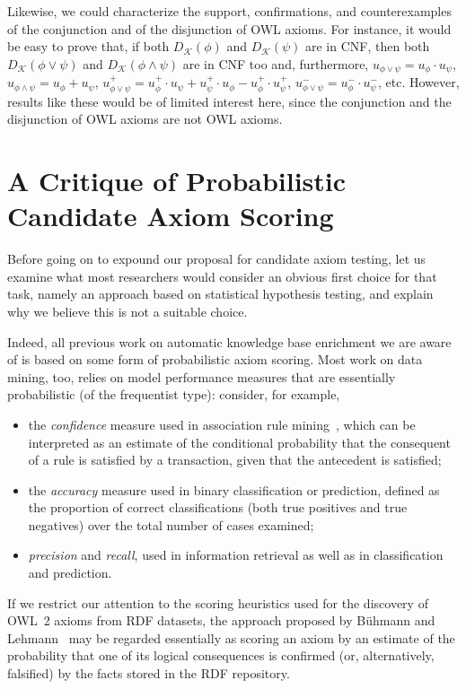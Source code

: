 \documentclass[review]{elsarticle}
\theoremstyle{definition}
\begin{document}
Likewise, we could characterize the support, confirmations, and counterexamples
of the conjunction and of the disjunction of OWL axioms. For instance, it would
be easy to prove that, if both $D_\mathcal{K}(\phi)$ and $D_\mathcal{K}(\psi)$
are in CNF, then both $D_\mathcal{K}(\phi \lor \psi)$ and
$D_\mathcal{K}(\phi \land \psi)$ are in CNF too and, furthermore,
$u_{\phi \lor \psi} = u_\phi \cdot u_\psi$, $u_{\phi \land \psi} = u_\phi + u_\psi$,
$u_{\phi \lor \psi}^+ = u_\phi^+\cdot u_\psi + u_\psi^+\cdot u_\phi
  - u_\phi^+\cdot u_\psi^+$,
$u_{\phi \lor \psi}^- = u_\phi^-\cdot u_\psi^-$,
etc.
However, results like these would be of limited interest here,
since the conjunction and the disjunction of OWL axioms are not OWL axioms.


\section{A Critique of Probabilistic Candidate Axiom Scoring}
\label{critique-of-probabilistic-scoring}

Before going on to expound our proposal for candidate axiom testing,
let us examine what most researchers would consider an obvious first choice for
that task, namely an approach based on statistical hypothesis testing,
and explain why we believe this is not a suitable choice.

Indeed, all previous work on automatic knowledge base enrichment we are aware of
is based on some form of probabilistic axiom scoring.
Most work on data mining, too, relies on model performance measures that are
essentially probabilistic (of the frequentist type): consider, for example,
\begin{itemize}
\item the \emph{confidence} measure used in association rule mining~\cite{Agrawal1993},
  which can be interpreted as an estimate of the conditional probability that
  the consequent of a rule is satisfied by a transaction, given that the
  antecedent is satisfied;
\item the \emph{accuracy} measure used in binary classification or prediction,
  defined as the proportion of correct classifications (both true positives
  and true negatives) over the total number of cases examined;
\item \emph{precision} and \emph{recall}, used in information retrieval as well as
  in classification and prediction.
\end{itemize}
If we restrict our attention to the scoring heuristics used for the discovery
of OWL~2 axioms from RDF datasets,
the approach proposed by B\"uhmann and Lehmann~\cite{BuehmannLehmann2012}
may be regarded essentially as scoring an axiom by an estimate of the probability
that one of its logical consequences is confirmed (or, alternatively, falsified)
by the facts stored in the RDF repository.
\end{document}
